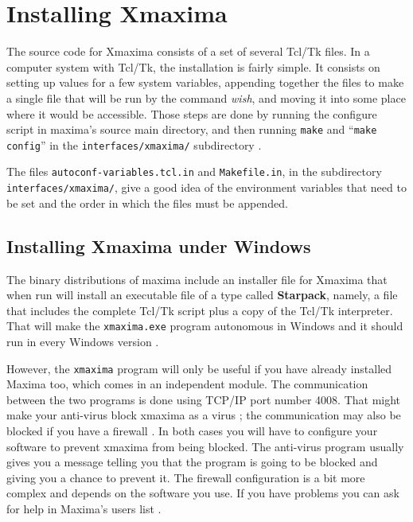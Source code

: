 \documentclass[12pt,makeidx,maxima]{book}
\begin{document}

\mainmatter

\chapter{Installing Xmaxima}

The source code for Xmaxima consists of a set of several Tcl/Tk files. In a
computer system with Tcl/Tk, the installation is fairly simple. It consists
on setting up values for a few system variables, appending together the
files to make a single file that will be run by the command \emph{wish},
and moving it into some place where it would be accessible. Those steps are
done by running the configure script in maxima's source main directory, and
then running \texttt{make} and ``\texttt{make config}'' in the
\texttt{interfaces/xmaxima/} subdirectory .

The files  \texttt{autoconf-variables.tcl.in} and
\texttt{Makefile.in}, in the subdirectory \texttt{interfaces/xmaxima/},
give a good idea of the environment variables that need to be set and the
order in which the files must be appended.
 

\clearpage
\section{Installing Xmaxima under Windows}

The binary distributions of maxima include an installer file for Xmaxima
that when run will install an executable file of a type called
 \textbf{Starpack}, namely, a file that includes the
complete Tcl/Tk  script plus a copy of the Tcl/Tk
interpreter. That will make the \texttt{xmaxima.exe} program autonomous in
Windows and it should run in every Windows version .

However, the \texttt{xmaxima} program will only be useful if you have
already installed Maxima too, which comes in an independent module. The
communication between the two programs is done using TCP/IP 
port number 4008.  That might make your anti-virus block xmaxima as a virus
; the communication may also be blocked if you have a
firewall . In both cases you will have to configure your
software to prevent xmaxima from being blocked. The anti-virus program
usually gives you a message telling you that the program is going to be
blocked and giving you a chance to prevent it. The firewall configuration
is a bit more complex and depends on the software you use.  If you have
problems you can ask for help in Maxima's users list .
\end{document}
